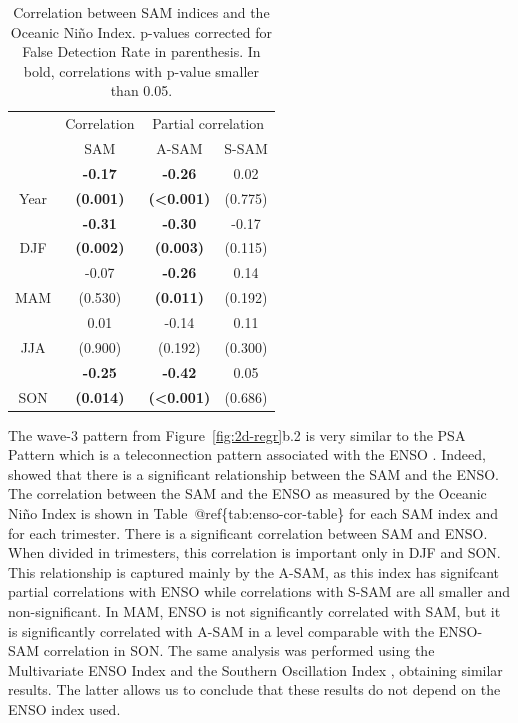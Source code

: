 \documentclass[smallextended]{svjour3}       %
\begin{document}
\begin{table}

\caption{\label{tab:enso-cor-table}Correlation between SAM indices and the Oceanic Niño Index. p-values corrected for False Detection Rate in parenthesis. In bold, correlations with p-value smaller than 0.05.}
\centering
\begin{tabular}[t]{c>{}c>{}c>{}c}
\toprule
\multicolumn{1}{c}{ } & \multicolumn{1}{c}{Correlation} & \multicolumn{2}{c}{Partial correlation} \\
\cmidrule(l{3pt}r{3pt}){2-2} \cmidrule(l{3pt}r{3pt}){3-4}
 & SAM & A-SAM & S-SAM\\
\midrule
 & \textbf{-0.17} & \textbf{-0.26} & 0.02\\
\cmidrule{2-4}
\multirow[t]{-2}{*}{\centering\arraybackslash Year} & \textbf{(0.001)} & \textbf{(<0.001)} & (0.775)\\
\cmidrule{1-4}
 & \textbf{-0.31} & \textbf{-0.30} & -0.17\\
\cmidrule{2-4}
\multirow[t]{-2}{*}{\centering\arraybackslash DJF} & \textbf{(0.002)} & \textbf{(0.003)} & (0.115)\\
\cmidrule{1-4}
 & -0.07 & \textbf{-0.26} & 0.14\\
\cmidrule{2-4}
\multirow[t]{-2}{*}{\centering\arraybackslash MAM} & (0.530) & \textbf{(0.011)} & (0.192)\\
\cmidrule{1-4}
 & 0.01 & -0.14 & 0.11\\
\cmidrule{2-4}
\multirow[t]{-2}{*}{\centering\arraybackslash JJA} & (0.900) & (0.192) & (0.300)\\
\cmidrule{1-4}
 & \textbf{-0.25} & \textbf{-0.42} & 0.05\\
\cmidrule{2-4}
\multirow[t]{-2}{*}{\centering\arraybackslash SON} & \textbf{(0.014)} & \textbf{(<0.001)} & (0.686)\\
\bottomrule
\end{tabular}
\end{table}

The wave-3 pattern from Figure~\ref{fig:2d-regr}b.2 is very similar to the PSA Pattern \citep{mo1987, kidson1988} which is a teleconnection pattern associated with the ENSO \citep{karoly1989}. Indeed, \citet{fogt2011} showed that there is a significant relationship between the SAM and the ENSO. The correlation between the SAM and the ENSO as measured by the Oceanic Niño Index \citep[ONI,][]{bamston1997} is shown in Table~@ref\{tab:enso-cor-table\} for each SAM index and for each trimester. There is a significant correlation between SAM and ENSO. When divided in trimesters, this correlation is important only in DJF and SON. This relationship is captured mainly by the A\nobreakdash-SAM, as this index has signifcant partial correlations with ENSO while correlations with S\nobreakdash-SAM are all smaller and non-significant. In MAM, ENSO is not significantly correlated with SAM, but it is significantly correlated with A\nobreakdash-SAM in a level comparable with the ENSO-SAM correlation in SON. The same analysis was performed using the Multivariate ENSO Index \citep{wolter2011} and the Southern Oscillation Index \citep{ropelewski1987}, obtaining similar results.
The latter allows us to conclude that these results do not depend on the ENSO index used.
\end{document}
